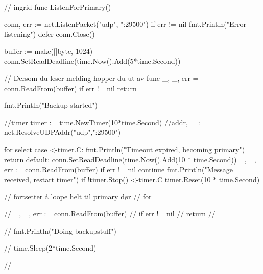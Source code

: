 // ingrid
func ListenForPrimary() {
    conn, err := net.ListenPacket("udp", ":29500")
    if err != nil {
        fmt.Println("Error listening")
    }
    defer conn.Close()

    buffer := make([]byte, 1024)
    conn.SetReadDeadline(time.Now().Add(5*time.Second))

    // Dersom du leser melding hopper du ut av func
    _, _, err = conn.ReadFrom(buffer)
    if err != nil {
        return
    }

    fmt.Println("Backup started")

    //timer
    timer := time.NewTimer(10*time.Second)
    //addr, _ := net.ResolveUDPAddr("udp",":29500")

    for {
        select {
        case <-timer.C:
            fmt.Println("Timeout expired, becoming primary")
            return
        default:
            conn.SetReadDeadline(time.Now().Add(10 * time.Second))
            _, _, err := conn.ReadFrom(buffer)
            if err != nil {
                continue
            }
            fmt.Println("Message received, restart timer")
            if !timer.Stop() {
                <-timer.C
            }
            timer.Reset(10 * time.Second)
        }
    }

    // fortsetter å loope helt til primary dør
    // for {
    //     _, _, err := conn.ReadFrom(buffer)
    //     if err != nil {
    //         return
    //     }

    //     fmt.Println("Doing backupstuff")

    //     time.Sleep(2*time.Second)

    // }




}
